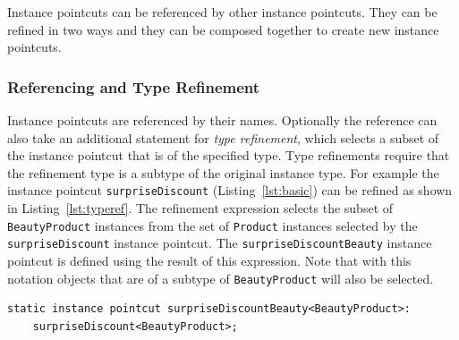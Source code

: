 \documentclass[10pt]{sigplanconf}
\newcommand{\lstinln}[1]{\lstinline~#1~}
\begin{document}
Instance pointcuts can be referenced by other instance pointcuts. They can be refined in two ways and they can be composed together to create new instance pointcuts.

\subsubsection{Referencing and Type Refinement}
\label{sect:typeref}
Instance pointcuts are referenced by their names. Optionally the reference can also take an additional statement for \emph{type refinement}, which selects a subset of the instance pointcut that is of the specified type. Type refinements require that the refinement type is a subtype of the original instance type. For example the instance pointcut \lstinln{surpriseDiscount} (Listing~\ref{lst:basic}) can be refined as shown in Listing~\ref{lst:typeref}. The refinement expression selects the subset of \lstinln{BeautyProduct} instances from the set of \lstinln{Product} instances selected by the \lstinln{surpriseDiscount} instance pointcut. The \lstinln{surpriseDiscountBeauty} instance pointcut is defined using the result of this expression. Note that with this notation objects that are of a subtype of \lstinln{BeautyProduct} will also be selected.

\begin{lstlisting}[float=h!, caption={A type refined pointcut},label={lst:typeref}]
static instance pointcut surpriseDiscountBeauty<BeautyProduct>:
	surpriseDiscount<BeautyProduct>;
\end{lstlisting}
\end{document}
